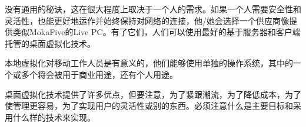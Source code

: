\documentclass[10pt,a4paper]{article}
\begin{document}
\begin{CJK*}{UTF8}{gkai}
没有通用的秘诀，这在很大程度上取决于一个人的需求。如果一个人需要安全性和灵活性，也能更好地运作并始终保持对网络的连接，他/她会选择一个供应商像提供类似MokaFive的Live PC。有了它们，人们可以使用最好的基于服务器和客户端托管的桌面虚拟化技术。 


本地虚拟化对移动工作人员是有意义的，他们能够使用单独的操作系统，其中的一个或多个将会被用于商业用途，还有个人用途。 


桌面虚拟化技术提供了许多优点，但要注意，为了紧跟潮流，为了降低成本，为了使管理更容易，为了实现用户的灵活性或别的东西。必须注意什么是主要目标和采用什么样的技术来实现。



\clearpage     
\end{CJK*}
\end{document}
